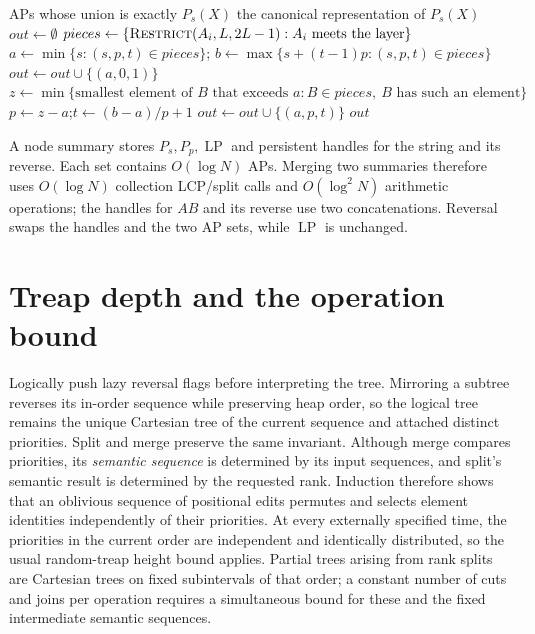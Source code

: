 ﻿\documentclass[11pt]{article}
\theoremstyle{plain}
\theoremstyle{remark}
\begin{document}
\begin{algorithm}[H]\footnotesize
\caption{$\textsc{Canon}(A_1,\dots,A_r)$: canonical dyadic form}
\label{alg:canon}
\begin{algorithmic}[1]
\Require APs whose union is exactly $P_s(X)$
\Ensure the canonical representation of $P_s(X)$
\State $out\gets\emptyset$
\For{each dyadic layer $[L,2L)$ met by some $A_i$}
  \State $pieces\gets\{\textsc{Restrict}(A_i,L,2L-1): A_i\text{ meets the layer}\}$
  \State $a\gets\min\{s:(s,p,t)\in pieces\}$;\quad
         $b\gets\max\{s+(t-1)p:(s,p,t)\in pieces\}$
    \State $out\gets out\cup\{(a,0,1)\}$
  \Else
    \State $z\gets\min\{\text{smallest element of }B\text{ that exceeds }a:
         B\in pieces,\ B\text{ has such an element}\}$
    \State $p\gets z-a$;\quad $t\gets (b-a)/p+1$
    \State $out\gets out\cup\{(a,p,t)\}$
  \EndIf
\EndFor
\State \Return $out$
\end{algorithmic}
\end{algorithm}

A node summary stores $P_s,P_p,\operatorname{LP}$ and persistent handles for the string and its reverse. Each set contains $O(\log N)$ APs. Merging two summaries therefore uses $O(\log N)$ collection LCP/split calls and $O(\log^2N)$ arithmetic operations; the handles for $AB$ and its reverse use two concatenations. Reversal swaps the handles and the two AP sets, while $\operatorname{LP}$ is unchanged.

\section{Treap depth and the operation bound}\label{sec:depth}
Logically push lazy reversal flags before interpreting the tree. Mirroring a subtree reverses its in-order sequence while preserving heap order, so the logical tree remains the unique Cartesian tree of the current sequence and attached distinct priorities. Split and merge preserve the same invariant. Although merge compares priorities, its \emph{semantic sequence} is determined by its input sequences, and split's semantic result is determined by the requested rank. Induction therefore shows that an oblivious sequence of positional edits permutes and selects element identities independently of their priorities. At every externally specified time, the priorities in the current order are independent and identically distributed, so the usual random-treap height bound applies. Partial trees arising from rank splits are Cartesian trees on fixed subintervals of that order; a constant number of cuts and joins per operation requires a simultaneous bound for these and the fixed intermediate semantic sequences.
\end{document}
